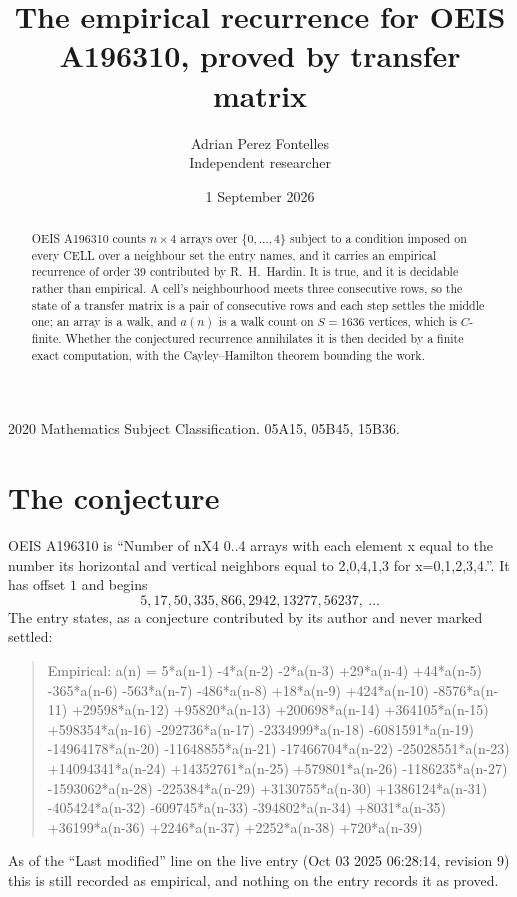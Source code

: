 \documentclass[11pt,a4paper]{article}
\title{The empirical recurrence for OEIS A196310, proved by transfer matrix}
\author{Adrian Perez Fontelles\\ \small Independent researcher}
\date{1 September 2026}
\theoremstyle{plain}
\theoremstyle{definition}
\begin{document}
\maketitle

\begin{abstract}
OEIS A196310 counts $n\times4$ arrays over $\{0,\dots,4\}$ subject to a condition imposed on
every CELL over a neighbour set the entry names, and it carries an empirical recurrence of
order $39$ contributed by R.~H.~Hardin. It is true, and it is decidable rather than
empirical. A cell's neighbourhood meets three consecutive rows, so the state of a transfer
matrix is a pair of consecutive rows and each step settles the middle one; an array is a
walk, and $a(n)$ is a walk count on $S=1636$ vertices, which is $C$-finite. Whether the
conjectured recurrence annihilates it is then decided by a finite exact computation, with the
Cayley--Hamilton theorem bounding the work.
\end{abstract}

\noindent\small 2020 Mathematics Subject Classification. 05A15, 05B45, 15B36.\normalsize

\section{The conjecture}

OEIS A196310 is ``Number of nX4 0..4 arrays with each element x equal to the number its horizontal and vertical neighbors equal to 2,0,4,1,3 for x=0,1,2,3,4.''. It has offset $1$ and begins
\[
5, 17, 50, 335, 866, 2942, 13277, 56237,\ \dots
\]
The entry states, as a conjecture contributed by its author and never marked settled:
\begin{quote}
Empirical: a(n) = 5*a(n-1) -4*a(n-2) -2*a(n-3) +29*a(n-4) +44*a(n-5) -365*a(n-6) -563*a(n-7) -486*a(n-8) +18*a(n-9) +424*a(n-10) -8576*a(n-11) +29598*a(n-12) +95820*a(n-13) +200698*a(n-14) +364105*a(n-15) +598354*a(n-16) -292736*a(n-17) -2334999*a(n-18) -6081591*a(n-19) -14964178*a(n-20) -11648855*a(n-21) -17466704*a(n-22) -25028551*a(n-23) +14094341*a(n-24) +14352761*a(n-25) +579801*a(n-26) -1186235*a(n-27) -1593062*a(n-28) -225384*a(n-29) +3130755*a(n-30) +1386124*a(n-31) -405424*a(n-32) -609745*a(n-33) -394802*a(n-34) +8031*a(n-35) +36199*a(n-36) +2246*a(n-37) +2252*a(n-38) +720*a(n-39)
\end{quote}
As of the ``Last modified'' line on the live entry (Oct 03 2025 06:28:14, revision 9) this is still
recorded as empirical, and nothing on the entry records it as proved.
\end{document}
